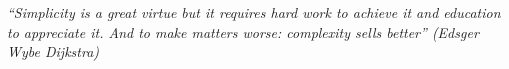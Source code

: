 \begin{epigrafe}
    \vspace*{\fill}
	\begin{flushright}
		\textit{
	    ``Simplicity is a great virtue but it requires hard work to achieve it and education to appreciate it. And to make matters worse: complexity sells better'' (Edsger Wybe Dijkstra)}
	\end{flushright}
\end{epigrafe}